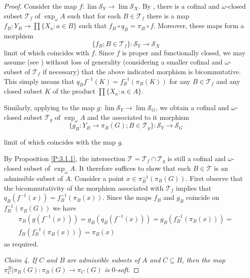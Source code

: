 \documentclass[12pt,draft]{amsart}
\theoremstyle{plain}
\theoremstyle{definition}
\numberwithin{equation}{section}
\begin{document}
\begin{proof}
Consider the map $f \colon \lim {\mathcal S}_{Y} \to
\lim {\mathcal S}_{X}$. By \cite[Theorem 1.3.4]{chibook96},
there is a cofinal and $\omega$-closed subset
${\mathcal T}_{f}$ of $\exp_{\omega}A$ such that for each
$B \in {\mathcal T}_{f}$ there is a map
$f_{B} \colon Y_{B} \to \prod\{ X_{a} \colon a \in B \}$ such
that $f_{B}\circ q_{B} = \pi_{B}\circ f$. Moreover, these maps
form a morphism
\[ \{ f_{B} ; B \in {\mathcal T}_{f}\} \colon {\mathcal S}_{Y}
\to {\mathcal S}_{X}\]
limit of which coincides with $f$. Since $f$ is proper and
functionally closed, we may assume (see
\cite[Proposition 6.2.9]{chibook96}) without loss of generality
(considering a smaller cofinal and $\omega$-subset of
${\mathcal T}_{f}$ if necessary) that the above indicated morphism
is bicommutative. This simply means that
$q_{B}f^{-1}(K) = f_{B}^{-1}\left(\pi_{B}(K)\right)$ for any
$B \in {\mathcal T}_{f}$ and any closed subset $K$ of the product
$\displaystyle \prod\{ X_{a} \colon a \in A\}$.

Similarly, applying \cite[Theorem 1.3.4]{chibook96} to the
map $g \colon \lim {\mathcal S}_{Y} \to \lim {\mathcal S}_{G}$,
we obtain a cofinal and $\omega$-closed subset
${\mathcal T}_{g}$ of $\exp_{\omega}A$ and the associated to
it morphism
\[ \{ g_{B} \colon Y_{B} \to \pi_{B}(G) ; B \in
{\mathcal T}_{g} \} \colon {\mathcal S}_{Y} \to {\mathcal S}_{G}\]

\noindent limit of which coincides with the map $g$.

By Proposition \ref{P:3.1.1}, the intersection
${\mathcal T} = {\mathcal T}_{f} \cap {\mathcal T}_{g}$
is still a cofinal and $\omega$-closed subset of $\exp_{\omega}A$.
It therefore suffices to show that each $B \in {\mathcal T}$ is
an admissible subset of $A$. Consider a point
$x \in \pi_{B}^{-1}\left( \pi_{B}(G)\right)$. First observe
that the bicommutativity of the morphism associated with
${\mathcal T}_{f}$ implies that
$q_{B}(f^{-1}(x)) = f_{B}^{-1}(\pi_{B}(x))$. Since the
maps $f_{B}$ and $g_{B}$ coincide on $f_{B}^{-1}(\pi_{B}(G))$ we have 
\begin{multline*}
\pi_{B}(g(f^{-1}(x))) = g_{B}(q_{B}(f^{-1}(x))) =
g_{B}(f_{B}^{-1}(\pi_{B}(x))) =\\ f_{B}(f_{B}^{-1}(\pi_{B}(x))) =
\pi_{B}(x)
\end{multline*}
as required.

{\em Claim 4. If $C$ and $B$ are admissible subsets of $A$
and $C \subseteq B$, then the map
$\pi_{C}^{B}|\pi_{B}(G) \colon \pi_{B}(G) \to \pi_{C}(G)$
is $0$-soft}.


\end{proof}
\end{document}
